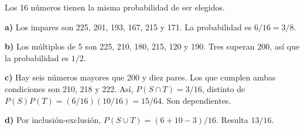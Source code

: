 Los 16 números tienen la misma probabilidad de ser elegidos.

\textbf{a)} Los impares son 225, 201, 193, 167, 215 y 171.
La probabilidad es $\boxed{6/16=3/8}$.

\textbf{b)} Los múltiplos de 5 son 225, 210, 180, 215, 120
y 190. Tres superan 200, así que la probabilidad es $\boxed{1/2}$.

\textbf{c)} Hay seis números mayores que 200 y diez pares.
Los que cumplen ambas condiciones son 210, 218 y 222.
Así, $P(S\cap T)=3/16$, distinto de
$P(S)P(T)=(6/16)(10/16)=15/64$. Son dependientes.

\textbf{d)} Por inclusión-exclusión, $P(S\cup T)=(6+10-3)/16$.
Resulta $\boxed{13/16}$.

